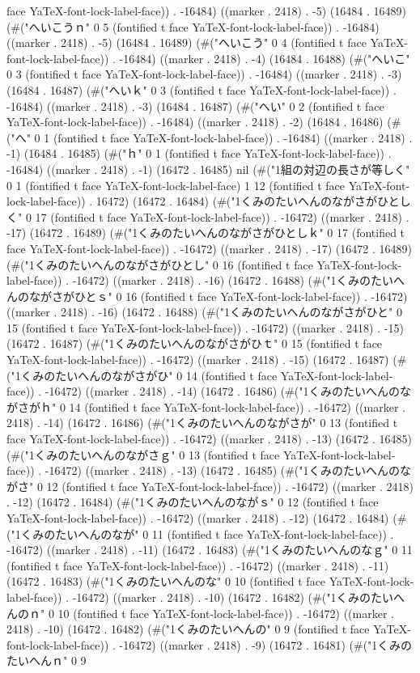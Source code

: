 face YaTeX-font-lock-label-face)) . -16484) ((marker . 2418) . -5) (16484 . 16489) (#("へいこうｎ" 0 5 (fontified t face YaTeX-font-lock-label-face)) . -16484) ((marker . 2418) . -5) (16484 . 16489) (#("へいこう" 0 4 (fontified t face YaTeX-font-lock-label-face)) . -16484) ((marker . 2418) . -4) (16484 . 16488) (#("へいこ" 0 3 (fontified t face YaTeX-font-lock-label-face)) . -16484) ((marker . 2418) . -3) (16484 . 16487) (#("へいｋ" 0 3 (fontified t face YaTeX-font-lock-label-face)) . -16484) ((marker . 2418) . -3) (16484 . 16487) (#("へい" 0 2 (fontified t face YaTeX-font-lock-label-face)) . -16484) ((marker . 2418) . -2) (16484 . 16486) (#("へ" 0 1 (fontified t face YaTeX-font-lock-label-face)) . -16484) ((marker . 2418) . -1) (16484 . 16485) (#("ｈ" 0 1 (fontified t face YaTeX-font-lock-label-face)) . -16484) ((marker . 2418) . -1) (16472 . 16485) nil (#("1組の対辺の長さが等しく" 0 1 (fontified t face YaTeX-font-lock-label-face) 1 12 (fontified t face YaTeX-font-lock-label-face)) . 16472) (16472 . 16484) (#("1くみのたいへんのながさがひとしく" 0 17 (fontified t face YaTeX-font-lock-label-face)) . -16472) ((marker . 2418) . -17) (16472 . 16489) (#("1くみのたいへんのながさがひとしｋ" 0 17 (fontified t face YaTeX-font-lock-label-face)) . -16472) ((marker . 2418) . -17) (16472 . 16489) (#("1くみのたいへんのながさがひとし" 0 16 (fontified t face YaTeX-font-lock-label-face)) . -16472) ((marker . 2418) . -16) (16472 . 16488) (#("1くみのたいへんのながさがひとｓ" 0 16 (fontified t face YaTeX-font-lock-label-face)) . -16472) ((marker . 2418) . -16) (16472 . 16488) (#("1くみのたいへんのながさがひと" 0 15 (fontified t face YaTeX-font-lock-label-face)) . -16472) ((marker . 2418) . -15) (16472 . 16487) (#("1くみのたいへんのながさがひｔ" 0 15 (fontified t face YaTeX-font-lock-label-face)) . -16472) ((marker . 2418) . -15) (16472 . 16487) (#("1くみのたいへんのながさがひ" 0 14 (fontified t face YaTeX-font-lock-label-face)) . -16472) ((marker . 2418) . -14) (16472 . 16486) (#("1くみのたいへんのながさがｈ" 0 14 (fontified t face YaTeX-font-lock-label-face)) . -16472) ((marker . 2418) . -14) (16472 . 16486) (#("1くみのたいへんのながさが" 0 13 (fontified t face YaTeX-font-lock-label-face)) . -16472) ((marker . 2418) . -13) (16472 . 16485) (#("1くみのたいへんのながさｇ" 0 13 (fontified t face YaTeX-font-lock-label-face)) . -16472) ((marker . 2418) . -13) (16472 . 16485) (#("1くみのたいへんのながさ" 0 12 (fontified t face YaTeX-font-lock-label-face)) . -16472) ((marker . 2418) . -12) (16472 . 16484) (#("1くみのたいへんのながｓ" 0 12 (fontified t face YaTeX-font-lock-label-face)) . -16472) ((marker . 2418) . -12) (16472 . 16484) (#("1くみのたいへんのなが" 0 11 (fontified t face YaTeX-font-lock-label-face)) . -16472) ((marker . 2418) . -11) (16472 . 16483) (#("1くみのたいへんのなｇ" 0 11 (fontified t face YaTeX-font-lock-label-face)) . -16472) ((marker . 2418) . -11) (16472 . 16483) (#("1くみのたいへんのな" 0 10 (fontified t face YaTeX-font-lock-label-face)) . -16472) ((marker . 2418) . -10) (16472 . 16482) (#("1くみのたいへんのｎ" 0 10 (fontified t face YaTeX-font-lock-label-face)) . -16472) ((marker . 2418) . -10) (16472 . 16482) (#("1くみのたいへんの" 0 9 (fontified t face YaTeX-font-lock-label-face)) . -16472) ((marker . 2418) . -9) (16472 . 16481) (#("1くみのたいへんｎ" 0 9 
